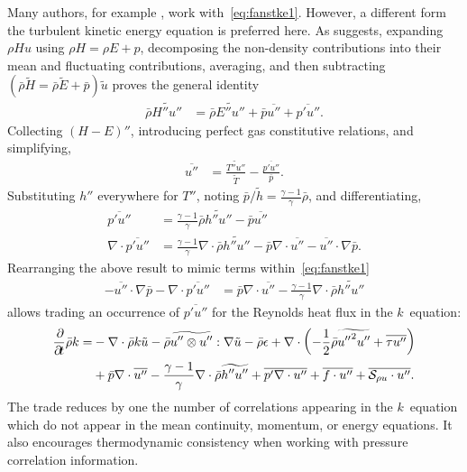 Many authors, for example \citet{Guarini2000Direct}, work
with~\eqref{eq:fanstke1}.  However, a different form the turbulent kinetic
energy equation is preferred here.  As \citet[page 216]{Lele1994Compressibility}
suggests, expanding $\rho H u$ using $\rho{}H = \rho{}E + p$, decomposing the
non-density contributions into their mean and fluctuating contributions,
averaging, and then subtracting $\left(\bar{\rho}\tilde{H} = \bar{\rho}\tilde{E}
+ \bar{p}\right)\tilde{u}$ proves the general identity
\begin{align}
    \bar{\rho}\widetilde{H''u''}
    &=
    \bar{\rho}\widetilde{E''u''}
    + \bar{p}\overline{u''}
    + \overline{p'u''}.
\end{align}
Collecting $\left(H-E\right)''$, introducing perfect gas constitutive relations,
and simplifying,
\begin{align}
  \overline{u''}
&=
  \frac{\widetilde{T''u''}}{\tilde{T}} - \frac{\overline{p'u''}}{\bar{p}}.
\end{align}
Substituting $h''$ everywhere for $T''$, noting $\bar{p}/\tilde{h} =
\frac{\gamma-1}{\gamma}\bar{\rho}$, and differentiating,
\begin{align}
  \overline{p'u''}
&=
  \frac{\gamma-1}{\gamma} \bar{\rho} \widetilde{h''u''}
- \bar{p} \overline{u''}
\\
  \nabla\cdot \overline{p'u''}
&=
  \frac{\gamma-1}{\gamma} \nabla\cdot \bar{\rho} \widetilde{h''u''}
- \bar{p}\nabla\cdot\overline{u''}
- \overline{u''}\cdot\nabla{}\bar{p}
.
\end{align}
Rearranging the above result to mimic terms within~\eqref{eq:fanstke1}
\begin{align}
  - \overline{u''}\cdot\nabla\bar{p}
  - \nabla\cdot\overline{p'u''}
&=
  \bar{p}\nabla\cdot\overline{u''}
- \frac{\gamma-1}{\gamma} \nabla\cdot \bar{\rho} \widetilde{h''u''}
\end{align}
allows trading an occurrence of $\overline{p'u''}$ for the Reynolds heat
flux in the $k$~equation:
\begin{align}
\label{eq:fanstke}
    \frac{\partial\!}{\partial\!t}\bar{\rho}k
 =
 &- \nabla\cdot\bar{\rho}k\tilde{u}
  - \bar{\rho} \widetilde{u''\otimes{}u''} : \nabla\tilde{u}
  - \bar{\rho} \epsilon
  + \nabla\cdot\left(
        -\frac{1}{2}\bar{\rho}\widetilde{{u''}^{2}u''}
      + \overline{\tau{}u''}
    \right)
\notag\\
 &+ \bar{p}\nabla\cdot\overline{u''}
  - \frac{\gamma-1}{\gamma} \nabla\cdot\bar{\rho} \widetilde{h''u''}
  + \overline{p' \nabla\cdot{}u''}
  + \overline{f\cdot{}u''}
  + \overline{\mathcal{S}_{\rho{} u}\cdot{}u''}.
\end{align}
The trade reduces by one the number of correlations appearing in the $k$~equation
which do not appear in the mean continuity, momentum, or energy
equations.  It also encourages thermodynamic consistency
when working with pressure correlation information.
%

